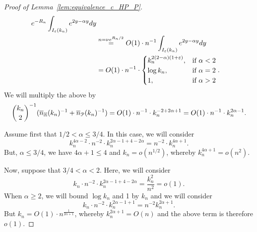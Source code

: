 \begin{proof}[Proof of Lemma~\ref{lem:equivalence_c_HP_P}]
\begin{equation*}
\begin{split}
e^{-R_n} \int_{I_\varepsilon (k_n)} e^{2y -\alpha y} dy \\
&\stackrel{n =\nu e^{R_n/2}}{=} O(1) \cdot n^{-1} \int_{I_\varepsilon (k_n)} e^{2y -\alpha y} dy \\
&= O(1) \cdot n^{-1} \cdot 
\begin{cases}
k_n^{2(2-\alpha) (1+\varepsilon)}, & \mbox{if $\alpha < 2$} \\
\log k_n, & \mbox{if $\alpha =2$} \\
1, & \mbox{if $\alpha >2$}
\end{cases}.
\end{split}
\end{equation*}
We will multiply the above by $${k_n \choose 2}^{-1} (\overline{n}_{\mathbb{H}}(k_n)^{-1} + \overline{n}_{{\mathcal P}}(k_n)^{-1}) = 
O(1) \cdot n^{-1} \cdot k_n^{-2 +2\alpha +1} = O(1) \cdot n^{-1} \cdot k_n^{2\alpha -1}.$$

Assume first that $1/2 <\alpha \leq 3/4$. In this case, we will consider
$$ k_n^{4\alpha -2} \cdot n^{-2} \cdot k_n^{2\alpha -1 + 4 - 2\alpha} = 
n^{-2} \cdot k_n^{4\alpha +1}.$$
But, $\alpha \leq 3/4$, we have $4\alpha +1 \leq 4$ and $k_n = o(n^{1/2})$, whereby $k_n^{4\alpha +1} = o(n^{2})$. 

Now, suppose that $3/4 < \alpha < 2$. Here, we will consider 
$$ k_n \cdot n^{-2} \cdot k_n^{2\alpha -1 + 4 - 2\alpha} =\frac{k_n^2}{n^2} = o(1).$$ 
When $\alpha \geq 2$, we will bound $\log k_n$ and 1 by $k_n$ and we will consider 
$$ k_n \cdot n^{-2} \cdot k_n^{2\alpha -1 +1}= n^{-2} k_n^{2\alpha +1}.$$ 
But $k_n = O(1)\cdot n^{\frac{1}{2\alpha +1}}$, whereby $k_n^{2\alpha +1} =O(n)$ and 
the above term is therefore $o(1)$.

\end{proof}


